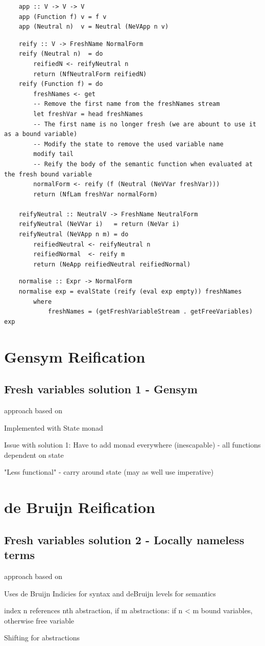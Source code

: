 \begin{lstlisting}
    app :: V -> V -> V
    app (Function f) v = f v
    app (Neutral n)  v = Neutral (NeVApp n v)
\end{lstlisting}


\begin{lstlisting}
    reify :: V -> FreshName NormalForm
    reify (Neutral n)  = do 
        reifiedN <- reifyNeutral n
        return (NfNeutralForm reifiedN)
    reify (Function f) = do
        freshNames <- get
        -- Remove the first name from the freshNames stream
        let freshVar = head freshNames
        -- The first name is no longer fresh (we are abount to use it as a bound variable)
        -- Modify the state to remove the used variable name
        modify tail
        -- Reify the body of the semantic function when evaluated at the fresh bound variable
        normalForm <- reify (f (Neutral (NeVVar freshVar)))
        return (NfLam freshVar normalForm)

    reifyNeutral :: NeutralV -> FreshName NeutralForm
    reifyNeutral (NeVVar i)   = return (NeVar i)
    reifyNeutral (NeVApp n m) = do
        reifiedNeutral <- reifyNeutral n
        reifiedNormal  <- reify m
        return (NeApp reifiedNeutral reifiedNormal)
\end{lstlisting}


\begin{lstlisting}
    normalise :: Expr -> NormalForm
    normalise exp = evalState (reify (eval exp empty)) freshNames 
        where
            freshNames = (getFreshVariableStream . getFreeVariables) exp
\end{lstlisting}

\section{Gensym Reification}

\subsection{Fresh variables solution 1 - Gensym}
approach based on \cite{slides}

Implemented with State monad

Issue with solution 1: Have to add monad everywhere (inescapable) - all functions dependent on state

"Less functional" - carry around state (may as well use imperative)
\section{de Bruijn Reification}
\subsection{Fresh variables solution 2 - Locally nameless terms}
approach based on \cite{deBruijn}

Uses de Bruijn Indicies for syntax and deBruijn levels for semantics

index n references nth abstraction,
if m abstractions: if n < m bound variables, otherwise free variable

Shifting for abstractions

